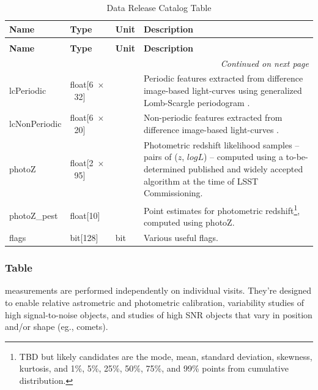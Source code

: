\documentclass[SE,lsstdraft,toc]{lsstdoc}
\newcommand\x         {\hbox{$\times$}}
\newenvironment{schema}[3]{%
\setlength\LTleft{0pt}
\setlength\LTright{\fill}
\begin{longtable}{p{0.2\textwidth}p{0.14\textwidth}p{0.14\textwidth}p{0.41\textwidth}}

\caption[#1]{#2\label{#3}}\\

\hline \textbf{Name} & \textbf{Type} & \textbf{Unit} & \textbf{Description}\\ \hline
\endfirsthead

\caption[#1]{#2}\\

\hline \textbf{Name} & \textbf{Type} & \textbf{Unit} & \textbf{Description}\\ \hline
\endhead

\hline \multicolumn{4}{r}{\emph{Continued on next page}} \\
\endfoot

\hline\hline
\endlastfoot
}{%
\hline
\end{longtable}
}
\begin{document}
\begin{schema}{\Object Table}{Data Release Catalog \Object Table}{tbl:objectTable}
lcPeriodic & float[6~\x~32] & ~ & Periodic features extracted from difference image-based light-curves using generalized Lomb-Scargle periodogram \citep[Table~4,][]{2011ApJ...733...10R}.\\

lcNonPeriodic & float[6~\x~20] & ~ & Non-periodic features extracted from difference image-based light-curves \citep[Table~5,][]{2011ApJ...733...10R}. \\


photoZ & float[2~\x~95] & ~ & Photometric redshift likelihood samples -- pairs of ($z$, $logL$) -- computed using a to-be-determined published and widely accepted algorithm at the time of LSST Commissioning. \\

photoZ\_pest & float[10] & ~ & Point estimates for photometric redshift\footnote{TBD but likely candidates
are the mode, mean, standard deviation, skewness, kurtosis, and 1\%, 5\%, 25\%, 50\%, 75\%, and 99\% points
from cumulative distribution.}, computed using photoZ. \\  

flags & bit[128] & bit & Various useful flags. \\
\end{schema}


\subsubsection{\Source Table}
\label{sec:sourceTable}

\Source measurements are performed independently on individual visits. They're designed to enable relative astrometric and photometric calibration, variability studies of high signal-to-noise objects, and studies of high SNR objects that vary in position and/or shape (eg., comets).
\end{document}
